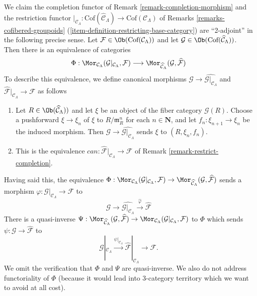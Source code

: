 \begin{remark}
\label{remark-completion-restriction-adjoint}
We claim the completion functor of
Remark \ref{remark-completion-morphism}
and the restriction functor
$|_{\mathcal{C}_\Lambda} : \text{Cof}(\widehat{\mathcal{C}}_\Lambda)
\to \text{Cof}(\mathcal{C}_\Lambda)$ of
Remarks \ref{remarks-cofibered-groupoids}
(\ref{item-definition-restricting-base-category})
are ``2-adjoint'' in the following precise sense. Let
$\mathcal{F} \in \Ob(\text{Cof}(\mathcal{C}_\Lambda))$
and let
$\mathcal{G} \in \Ob(\text{Cof}(\widehat{\mathcal{C}}_\Lambda))$.
Then there is an equivalence of categories
$$
\Phi :
\Mor_{\mathcal{C}_\Lambda}(
\mathcal{G}|_{\mathcal{C}_\Lambda}, \mathcal{F})
\longrightarrow
\Mor_{\widehat{\mathcal{C}}_\Lambda}(\mathcal{G}, \widehat{\mathcal{F}})
$$
To describe this equivalence, we
define canonical morphisms
$\mathcal{G} \to \widehat{\mathcal{G}|_{\mathcal{C}_\Lambda}}$ and
$\widehat{\mathcal{F}}|_{\mathcal{C}_\Lambda} \to \mathcal{F}$ as follows
\begin{enumerate}
\item Let $R \in \Ob(\widehat{\mathcal{C}}_\Lambda))$ and let $\xi$
be an object of the fiber category $\mathcal{G}(R)$.
Choose a pushforward $\xi \to \xi_n$ of $\xi$ to
$R/\mathfrak m_R^n$ for each $n \in \mathbf{N}$, and let
$f_n : \xi_{n + 1} \to \xi_n$ be the induced morphism.
Then $\mathcal{G} \to \widehat{\mathcal{G}|_{\mathcal{C}_\Lambda}}$
sends $\xi$ to $(R, \xi_n, f_n)$.
\item This is the equivalence
$can : \widehat{\mathcal{F}}|_{\mathcal{C}_\Lambda} \to \mathcal{F}$
of
Remark \ref{remark-restrict-completion}.
\end{enumerate}
Having said this, the equivalence
$\Phi : \Mor_{\mathcal{C}_\Lambda}(
\mathcal{G}|_{\mathcal{C}_\Lambda}, \mathcal{F})  \to
\Mor_{\widehat{\mathcal{C}}_\Lambda}(\mathcal{G},
\widehat{\mathcal{F}})$
sends a morphism
$\varphi : \mathcal{G}|_{\mathcal{C}_\Lambda} \to \mathcal{F}$
to
$$
\mathcal{G} \to \widehat{\mathcal{G}|_{\mathcal{C}_\Lambda}}
\xrightarrow{\widehat{\varphi}} \widehat{\mathcal{F}}
$$
There is a quasi-inverse
$\Psi :
\Mor_{\widehat{\mathcal{C}}_\Lambda}(
\mathcal{G}, \widehat{\mathcal{F}}) \to
\Mor_{\mathcal{C}_\Lambda}(
\mathcal{G}|_{\mathcal{C}_\Lambda}, \mathcal{F})$
to $\Phi$ which sends $\psi : \mathcal{G} \to \widehat{\mathcal{F}}$ to
$$
\mathcal{G}|_{\mathcal{C}_\Lambda} \xrightarrow{\psi|_{\mathcal{C}_\Lambda}}
\widehat{\mathcal{F}}|_{\mathcal{C}_\Lambda} \to \mathcal{F}.
$$
We omit the verification that $\Phi$ and $\Psi$ are quasi-inverse.
We also do not address functoriality of $\Phi$ (because it would
lead into 3-category territory which we want to avoid at all cost).
\end{remark}

